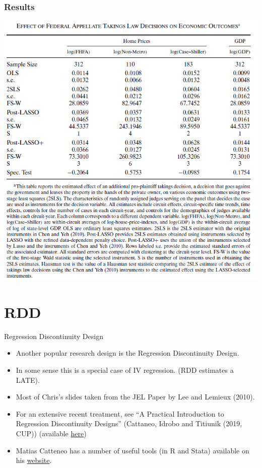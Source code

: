 \begin{frame}
  \frametitle{Results}
  \vspace{-10pt}
  \begin{center}
    \includegraphics[width=1\textwidth]{./resources/belloniTakingsResults}
  \end{center}  
\end{frame}

\section{RDD}
\begin{frame}{Regression Discontinuity Design}
\begin{itemize}
\item Another popular research design is the \alert{Regression Discontinuity Design}.
\item In some sense this is a special case of IV regression. (RDD estimates a LATE).
\item Most of Chris's slides taken from the JEL Paper by Lee and Lemieux (2010).
\item For an extensive recent treatment, see ``A Practical Introduction to Regression Discontinuity Designs'' (Cattaneo, Idrobo and Titiunik (2019, CUP)) (available \href{https://sites.google.com/site/rdpackages/replication/cit-2019-cup}{here})
\item Matias Catteneo has a number of useful tools (in R and Stata) available on his \href{https://sites.google.com/site/matiasdcattaneo/publications}{website}.
\end{itemize}              
\end{frame}

